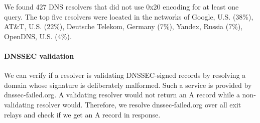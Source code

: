 We found 427 DNS resolvers that did not use 0x20 encoding for at least one
query.  The top five resolvers were located in the networks of Google, U.S.
(38\%), AT\&T, U.S. (22\%), Deutsche Telekom, Germany (7\%), Yandex, Russia
(7\%), OpenDNS, U.S. (4\%).

\paragraph{DNSSEC validation}
We can verify if a resolver is validating DNSSEC-signed records by resolving a
domain whose signature is deliberately malformed.  Such a service is provided
by dnssec-failed.org.  A validating resolver would not return an A record while
a non-validating resolver would.  Therefore, we resolve dnssec-failed.org over
all exit relays and check if we get an A record in response.
\fi
